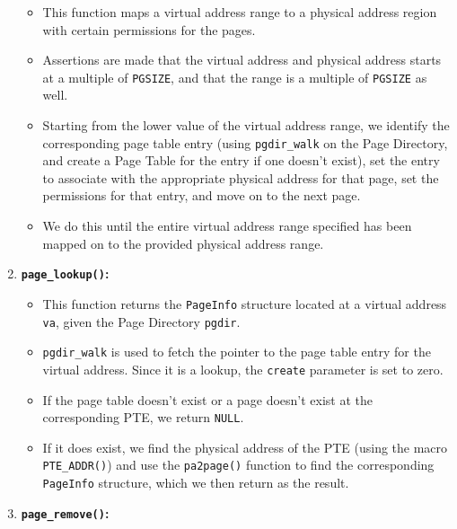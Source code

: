 \documentclass[]{article}
\begin{document}
\begin{enumerate}
  \begin{itemize}
  \itemsep1pt\parskip0pt
  \item
    This function maps a virtual address range to a physical address
    region with certain permissions for the pages.
  \item
    Assertions are made that the virtual address and physical address
    starts at a multiple of \texttt{PGSIZE}, and that the range is a
    multiple of \texttt{PGSIZE} as well.
  \item
    Starting from the lower value of the virtual address range, we
    identify the corresponding page table entry (using
    \texttt{pgdir\_walk} on the Page Directory, and create a Page Table
    for the entry if one doesn't exist), set the entry to associate with
    the appropriate physical address for that page, set the permissions
    for that entry, and move on to the next page.
  \item
    We do this until the entire virtual address range specified has been
    mapped on to the provided physical address range.
  \end{itemize}
\item
  \textbf{\texttt{page\_lookup()}:}

  \begin{itemize}
  \itemsep1pt\parskip0pt
  \item
    This function returns the \texttt{PageInfo} structure located at a
    virtual address \texttt{va}, given the Page Directory
    \texttt{pgdir}.
  \item
    \texttt{pgdir\_walk} is used to fetch the pointer to the page table
    entry for the virtual address. Since it is a lookup, the
    \texttt{create} parameter is set to zero.
  \item
    If the page table doesn't exist or a page doesn't exist at the
    corresponding PTE, we return \texttt{NULL}.
  \item
    If it does exist, we find the physical address of the PTE (using the
    macro \texttt{PTE\_ADDR()}) and use the \texttt{pa2page()} function
    to find the corresponding \texttt{PageInfo} structure, which we then
    return as the result.
  \end{itemize}
\item
  \textbf{\texttt{page\_remove()}:}


\end{enumerate}
\end{document}
